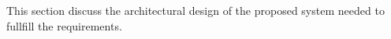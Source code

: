 This section discuss the architectural design of the proposed system needed to fullfill the requirements.